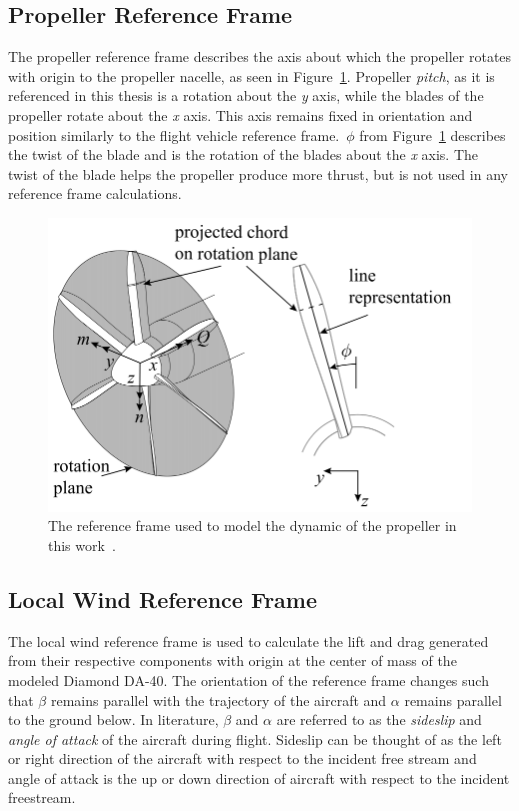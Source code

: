 \subsection{\textbf{Propeller Reference Frame}}
The propeller reference frame describes the axis about which the propeller rotates with origin to the propeller nacelle, as seen in Figure~\ref{fig:propframe}. Propeller \textit{pitch}, as it is referenced in this thesis is a rotation about the \textit{y} axis, while the blades of the propeller rotate about the \textit{x} axis. This axis remains fixed in orientation and position similarly to the flight vehicle reference frame.~\( \phi{}\) from Figure~\ref{fig:propframe} describes the twist of the blade and is the rotation of the blades about the \textit{x} axis. The twist of the blade helps the propeller produce more thrust, but is not used in any reference frame calculations.

\begin{figure}[!ht]
    \centering
    \includegraphics[width=0.75\linewidth]{Figures/propframe.png}
    \caption{The reference frame used to model the dynamic of the propeller in this work~\cite{vanarnhemEngineeringMethodEstimate2020}.}\label{fig:propframe}
\end{figure}

\subsection{\textbf{Local Wind Reference Frame}}
The local wind reference frame is used to calculate the lift and drag generated from their respective components with origin at the center of mass of the modeled Diamond DA-40. The orientation of the reference frame changes such that \(\beta \) remains parallel with the trajectory of the aircraft and \(\alpha \) remains parallel to the ground below. In literature, \( \beta \) and \(\alpha \) are referred to as the \textit{sideslip} and \textit{angle of attack} of the aircraft during flight. Sideslip can be thought of as the left or right direction of the aircraft with respect to the incident free stream and angle of attack is the up or down direction of aircraft with respect to the incident freestream.

